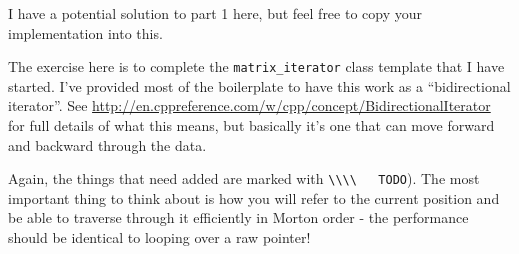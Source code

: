 \documentclass{article}
\newcommand{\code}[1]{\lstinline!#1!}
\begin{document}
I have a potential solution to part 1 here, but feel free to copy
your implementation into this. 

The exercise here is to complete the \code{matrix_iterator} class
template that I have started. I've provided most of the boilerplate to
have this work as a ``bidirectional iterator''.  See
\url{http://en.cppreference.com/w/cpp/concept/BidirectionalIterator}
for full details of what this means, but basically it's one that can
move forward and backward through the data.

Again, the things that need added are marked with \code{\\\\
  TODO}). The most important thing to think about is how you will
refer to the current position and be able to traverse through it
efficiently in Morton order - the performance should be identical to
looping over a raw pointer!
\end{document}
